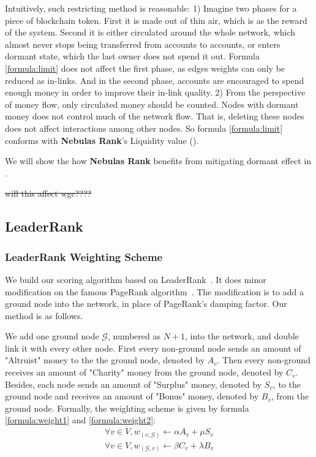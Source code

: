 Intuitively, such restricting method is reasonable: 1) Imagine two phases for a piece of blockchain token. First it is made out of thin air, which is as the reward of the system. Second it is either circulated around the whole network, which almost never stops being transferred from accounts to accounts, or enters dormant state, which the last owner does not spend it out. Formula \ref{formula:limit} does not affect the first phase, as edges weights can only be reduced as in-links. And in the second phase, accounts are encouraged to spend enough money in order to improve their in-link quality. 2) From the perspective of money flow, only circulated money should be counted. Nodes with dormant money does not control much of the network flow. That is, deleting these nodes does not affect interactions among other nodes. So formula \ref{formula:limit} conforms with \textbf{Nebulas Rank}'s Liquidity value ().

We will show the how \textbf{Nebulas Rank} benefits from mitigating dormant effect in .

\st{will this affect wgc????}

\subsection{LeaderRank} \label{sec:leaderrank}

\subsubsection{LeaderRank Weighting Scheme}
We build our scoring algorithm based on LeaderRank~\cite{Li2014}\cite{Chen2013}. It does minor modification on the famous PageRank algorithm~\cite{Brin2010}\cite{page1999pagerank}. The modification is to add a ground node into the network, in place of PageRank's damping factor. Our method is as follows.

We add one ground node $\mathcal{G}$, numbered as $N+1$, into the network, and double link it with every other node. First every non-ground node sends an amount of "Altruist" money to the the ground node, denoted by $A_v$. Then every non-ground receives an amount of "Charity" money from the ground node, denoted by $C_v$. Besides, each node sends an amount of "Surplus" money, denoted by $S_v$, to the ground node and receives an amount of "Bonus" money, denoted by $B_v$, from the ground node. Formally, the weighting scheme is given by formula \ref{formula:weight1} and \ref{formula:weight2}:
\begin{align}\label{formula:weight1}
	\forall v \in V, w_{(v, \mathcal{G})} \leftarrow \alpha A_v + \mu S_v
\end{align}
\begin{align}\label{formula:weight2}
\forall v \in V, w_{(\mathcal{G}, v)} \leftarrow \beta C_v + \lambda B_v
\end{align}

